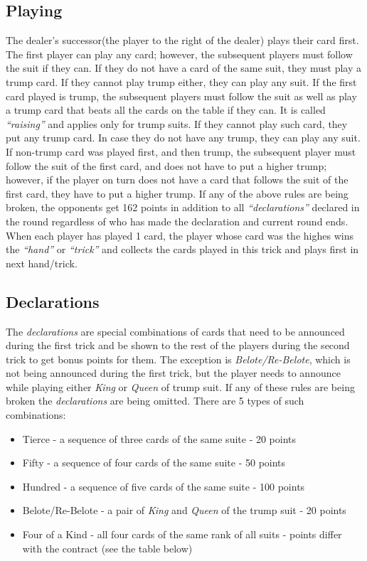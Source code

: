 \subsection{Playing}
\hspace{\parindent} The dealer's successor(the player to the right of the dealer) plays their card first.
The first player can play any card; however, the subsequent players must follow the suit if they can.
If they do not have a card of the same suit, they must play a trump card.
If they cannot play trump either, they can play any suit.
If the first card played is trump, the subsequent players must follow the suit as well as play a trump card that beats all the cards on the table if they can.
It is called \textit{``raising''} and applies only for trump suits.
If they cannot play such card, they put any trump card.
In case they do not have any trump, they can play any suit.
If non-trump card was played first, and then trump, the subsequent player must follow the suit of the first card, and does not have to put a higher trump; however, if the player on turn does not have a card that follows the suit of the first card, they have to put a higher trump.
If any of the above rules are being broken, the opponents get 162 points in addition to all \textit{``declarations''} declared in the round regardless of who has made the declaration and current round ends.
When each player has played 1 card, the player whose card was the highes wins the \textit{``hand''} or \textit{``trick''} and collects the cards played in this trick and plays first in next hand/trick.

\subsection{Declarations}

\hspace{\parindent} The \textit{declarations} are special combinations of cards that need to be announced during the first trick and be shown to the rest of the players during the second trick to get bonus points for them.
The exception is \textit{Belote/Re-Belote}, which is not being announced during the first trick, but the player needs to announce while playing either \textit{King} or \textit{Queen} of trump suit.
If any of these rules are being broken the \textit{declarations} are being omitted.
There are 5 types of such combinations:
\begin{itemize}
    \item Tierce - a sequence of three cards of the same suite - 20 points
    \item Fifty - a sequence of four cards of the same suite - 50 points
    \item Hundred - a sequence of five cards of the same suite - 100 points
    \item Belote/Re-Belote - a pair of \textit{King} and \textit{Queen} of the trump suit -  20 points
    \item Four of a Kind - all four cards of the same rank of all suits - points differ with the contract (see the table below)
\end{itemize}


